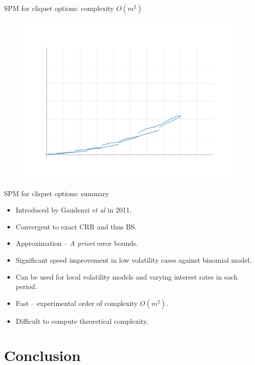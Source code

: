 \documentclass[utf8,t,xcolor=svgnames]{beamer}
\newcommand\pro{\item[\textbf{\CheckedBox}]}
\newcommand\con{\item[\textbf{\XBox}]}
\newcommand\neu{\item[\textbf{\Square}]}
\begin{document}
\begin{frame}{SPM for cliquet options: complexity $ O(m^2) $}
	\begin{figure}
		\centering
		\includegraphics[height=0.75\textheight,width=\textwidth]{../img/timing-cliquet}
	\end{figure}
\end{frame}


\begin{frame}{SPM for cliquet options: summary}
	\begin{itemize}
		\neu Introduced by Gaudenzi \emph{et al} \cite{Gaudenzi2011} in 2011.
		\pro Convergent to exact CRR and thus BS.
		\pro Approximation -- \emph{A priori} error bounds.
		\pro Significant speed improvement in low volatility cases against binomial model.
		\pro<alert@1-> Can be used for local volatility models and varying interest rates in each period.
		\pro<alert@1-> Fast -- experimental order of complexity $ O(m^2) $.
		\con Difficult to compute theoretical complexity.
	\end{itemize}
\end{frame}


\section{Conclusion}
\end{document}
